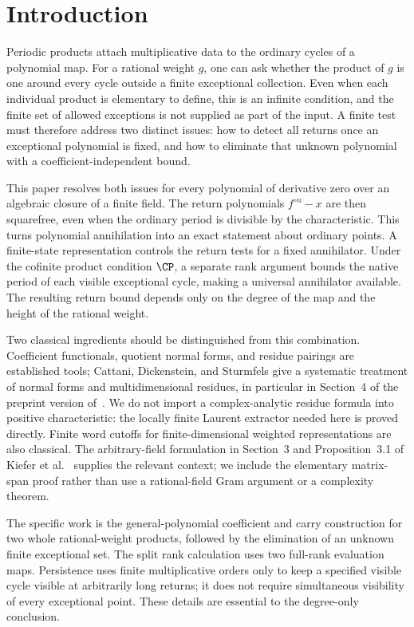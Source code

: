\section{Introduction}

Periodic products attach multiplicative data to the ordinary cycles
of a polynomial map. For a rational weight $g$, one can ask whether
the product of $g$ is one around every cycle outside a finite
exceptional collection. Even when each individual product is elementary to define,
this is an infinite condition, and the finite set of allowed
exceptions is not supplied as part of the input. A finite test must
therefore address two distinct issues: how to detect all returns
once an exceptional polynomial is fixed, and how to eliminate that
unknown polynomial with a coefficient-independent bound.

This paper resolves both issues for every polynomial of derivative
zero over an algebraic closure of a finite field. The return
polynomials $f^{\circ n}-x$ are then squarefree, even when the
ordinary period is divisible by the characteristic. This turns
polynomial annihilation into an exact statement about ordinary
points. A finite-state representation controls the return tests for
a fixed annihilator. Under the cofinite product condition $\CP$,
a separate rank argument bounds the native period of each visible
exceptional cycle, making a universal
annihilator available. The resulting return bound depends only on
the degree of the map and the height of the rational weight.

Two classical ingredients should be distinguished from this
combination. Coefficient functionals, quotient normal forms, and
residue pairings are established tools; Cattani, Dickenstein, and
Sturmfels give a systematic treatment of normal forms and
multidimensional residues, in particular in Section~4 of the
preprint version of~\cite{CDS1996}. We do not import a complex-analytic residue
formula into positive characteristic: the locally finite Laurent
extractor needed here is proved directly. Finite word cutoffs for
finite-dimensional weighted representations are also classical.
The arbitrary-field formulation in Section~3 and Proposition~3.1
of Kiefer et al.~\cite{Kiefer2013} supplies the relevant context;
we include the elementary matrix-span proof rather than use a
rational-field Gram argument or a complexity theorem.

The specific work is the general-polynomial coefficient and carry
construction for two whole rational-weight products, followed by
the elimination of an unknown finite exceptional set. The split
rank calculation uses two full-rank evaluation maps. Persistence
uses finite multiplicative orders only to keep a specified visible
cycle visible at arbitrarily long returns; it does not require
simultaneous visibility of every exceptional point. These details
are essential to the degree-only conclusion.

